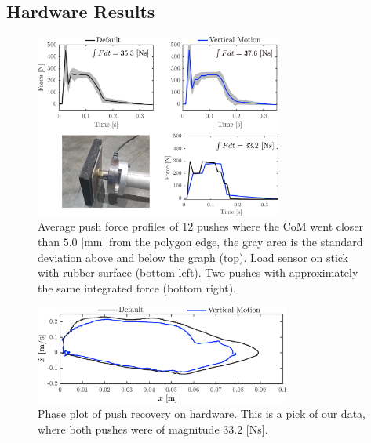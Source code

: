 \documentclass[letterpaper, 10 pt, conference]{ieeeconf}  %
\begin{document}
\subsection{Hardware Results}\label{subsec:hardware}
\begin{figure}
      \centering
      \includegraphics[width=3.2in]{impulsecompare2.png}
      \caption{Average push force profiles of $12$ pushes where the CoM went closer than $5.0$ [mm] from the polygon edge, the gray area is the standard deviation above and below the graph (top). Load sensor on stick with rubber surface (bottom left). Two pushes with approximately the same integrated force (bottom right).}
      \label{fig:impulsecompare}
\end{figure}
\begin{figure}
      \centering
      \includegraphics[width=3.3in]{valcomparephaseHW.png}
      \caption{Phase plot of push recovery on hardware. This is a pick of our data, where both pushes were of magnitude $33.2$ [Ns]. }
      \label{fig:valcomparephaseHW}
\end{figure}
\end{document}

